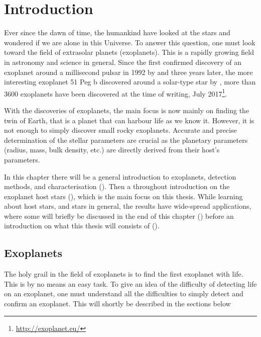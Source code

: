 \chapter{Introduction}
\label{cha:introduction}

Ever since the dawn of time, the humankind have looked at the stars and wondered if we are alone in
this Universe. To answer this question, one must look toward the field of extrasolar planets
(exoplanets). This is a rapidly growing field in astronomy and science in general. Since the first
confirmed discovery of an exoplanet around a millisecond pulsar in 1992 by \citet{Wolszczan1992} and
three years later, the more interesting exoplanet 51 Peg b discovered around a solar-type star by
\citet{Mayor1995}, more than 3600 exoplanets have been discovered at the time of writing, July
2017\footnote{\url{http://exoplanet.eu/}}.

With the discoveries of exoplanets, the main focus is now mainly on finding the twin of Earth, that
is a planet that can harbour life as we know it. However, it is not enough to simply discover small
rocky exoplanets. Accurate and precise determination of the stellar parameters are crucial as the
planetary parameters (radius, mass, bulk density, etc.) are directly derived from their host's
parameters.

In this chapter there will be a general introduction to exoplanets, detection methods, and
characterisation (). Then a throughout introduction on the exoplanet host
stars (), which is the main focus on this thesis. While learning about
host stars, and stars in general, the results have wide-spread applications, where some will briefly
be discussed in the end of this chapter () before an introduction on
what this thesis will consists of ().



\section{Exoplanets}
\label{sec:exoplanets}

The holy grail in the field of exoplanets is to find the first exoplanet with life. This is by no
means an easy task. To give an idea of the difficulty of detecting life on an exoplanet, one must
understand all the difficulties to simply detect and confirm an exoplanet. This will shortly be
described in the sections below

